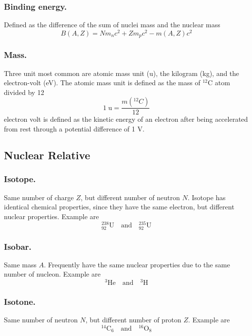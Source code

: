 \documentclass[../../../main.tex]{subfiles}
\begin{document}
\subsubsection*{Binding energy.} Defined as the difference of the sum of nuclei mass and the nuclear mass 
\begin{equation*}
    B(A,Z)=Nm_nc^2+Zm_pc^2-m(A,Z)c^2
\end{equation*} 

\subsubsection*{Mass.} Three unit most common are atomic mass unit (u), the kilogram (kg), and the electron-volt (eV). The atomic mass unit is defined as the mass of $^{12}$C atom divided by 12
\begin{equation*}
    1\;\text{u}=\frac{m (^{12}C)}{12}
\end{equation*}
electron volt is defined as the kinetic energy of an electron after being accelerated from rest through a potential diﬀerence of 1 V.

\subsection*{Nuclear Relative}
\subsubsection*{Isotope.} Same number of charge $Z$, but different number of neutron $N$. Isotope has identical chemical properties, since they have the same electron, but different nuclear properties. Example are
\begin{equation*}
    ^{238}_{92}\text{U}\quad\text{and}\quad    ^{235}_{92}\text{U}
\end{equation*}

\subsubsection*{Isobar.} Same mass $A$. Frequently have the same nuclear properties due to the same number of nucleon. Example are
\begin{equation*}
    ^{3}\text{He}\quad\text{and}\quad    ^{3}\text{H}
\end{equation*}

\subsubsection*{Isotone.} Same number of neutron $N$, but different number of proton $Z$. Example are
\begin{equation*}
    ^{14}\text{C}_6\quad\text{and}\quad    ^{16}\text{O}_8
\end{equation*}
\end{document}
